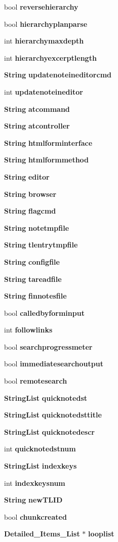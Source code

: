 \begin{CompactItemize}
\item 
bool {\bf reversehierarchy}
\item 
bool {\bf hierarchyplanparse}
\item 
int {\bf hierarchymaxdepth}
\item 
int {\bf hierarchyexcerptlength}
\item 
{\bf String} {\bf updatenoteineditorcmd}
\item 
int {\bf updatenoteineditor}
\item 
{\bf String} {\bf atcommand}
\item 
{\bf String} {\bf atcontroller}
\item 
{\bf String} {\bf htmlforminterface}
\item 
{\bf String} {\bf htmlformmethod}
\item 
{\bf String} {\bf editor}
\item 
{\bf String} {\bf browser}
\item 
{\bf String} {\bf flagcmd}
\item 
{\bf String} {\bf notetmpfile}
\item 
{\bf String} {\bf tlentrytmpfile}
\item 
{\bf String} {\bf configfile}
\item 
{\bf String} {\bf tareadfile}
\item 
{\bf String} {\bf finnotesfile}
\item 
bool {\bf calledbyforminput}
\item 
int {\bf followlinks}
\item 
bool {\bf searchprogressmeter}
\item 
bool {\bf immediatesearchoutput}
\item 
bool {\bf remotesearch}
\item 
{\bf String\-List} {\bf quicknotedst}
\item 
{\bf String\-List} {\bf quicknotedsttitle}
\item 
{\bf String\-List} {\bf quicknotedescr}
\item 
int {\bf quicknotedstnum}
\item 
{\bf String\-List} {\bf indexkeys}
\item 
int {\bf indexkeysnum}
\item 
{\bf String} {\bf new\-TLID}
\item 
bool {\bf chunkcreated}
\item 
{\bf Detailed\_\-Items\_\-List} $\ast$ {\bf looplist}
\end{CompactItemize}


